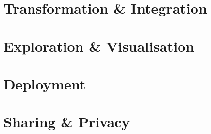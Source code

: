 \documentclass[11pt,a4paper]{article}
\begin{document}
\section{Transformation \& Integration}\label{sec_transformation_and_integration}

\section{Exploration \& Visualisation}\label{sec_exploration_and_visualisation}

\section{Deployment}\label{sec_deployment}

\section{Sharing \& Privacy}\label{sec_sharing_and_privacy}
\end{document}
